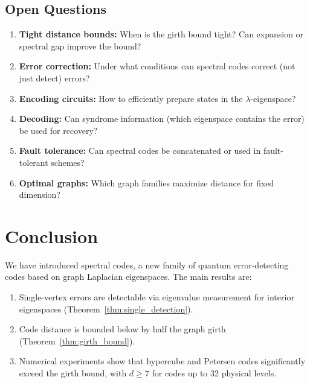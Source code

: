 \documentclass[11pt,a4paper]{article}
\theoremstyle{definition}
\begin{document}
\subsection{Open Questions}

\begin{enumerate}
    \item \textbf{Tight distance bounds:} When is the girth bound tight? Can expansion or spectral gap improve the bound?
    
    \item \textbf{Error correction:} Under what conditions can spectral codes correct (not just detect) errors?
    
    \item \textbf{Encoding circuits:} How to efficiently prepare states in the $\lambda$-eigenspace?
    
    \item \textbf{Decoding:} Can syndrome information (which eigenspace contains the error) be used for recovery?
    
    \item \textbf{Fault tolerance:} Can spectral codes be concatenated or used in fault-tolerant schemes?
    
    \item \textbf{Optimal graphs:} Which graph families maximize distance for fixed dimension?
\end{enumerate}

\section{Conclusion}
\label{sec:conclusion}

We have introduced spectral codes, a new family of quantum error-detecting codes based on graph Laplacian eigenspaces. The main results are:

\begin{enumerate}
    \item Single-vertex errors are detectable via eigenvalue measurement for interior eigenspaces (Theorem~\ref{thm:single_detection}).
    
    \item Code distance is bounded below by half the graph girth (Theorem~\ref{thm:girth_bound}).
    
    \item Numerical experiments show that hypercube and Petersen codes significantly exceed the girth bound, with $d \geq 7$ for codes up to 32 physical levels.
\end{enumerate}
\end{document}
